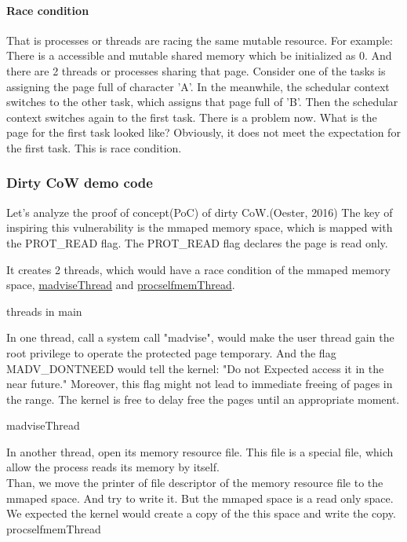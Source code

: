 \documentclass[12pt,a4paper]{IEEEconf}
\begin{document}
\paragraph{Race condition}
That is processes or threads are racing the same mutable resource. For example:
There is a accessible and mutable shared memory which be initialized as 0. And there
are 2 threads or processes sharing that page. Consider one of the tasks is assigning
the page full of character 'A'. In the meanwhile, the schedular context switches to
the other task, which assigns that page full of 'B'. Then the schedular context switches
again to the first task. There is a problem now. What is the page for the first
task looked like? Obviously, it does not meet the expectation for the first task.
This is race condition.

\subsubsection{Dirty CoW demo code}
Let's analyze the proof of concept(PoC) of dirty CoW.(Oester, 2016)\cite{Dirty_CoW}
The key of inspiring this vulnerability is the mmaped memory space, which is mapped with
the PROT\_READ flag. The PROT\_READ flag declares the page is read only.


It creates 2 threads, which would have a race condition of the mmaped memory space,
\hyperlink{madvise}{madviseThread} and \hyperlink{procself}{procselfmemThread}.

\hypertarget{threads_main}{threads in main}


In one thread, call a system call "madvise", would make the user thread gain the root
privilege to operate the protected page temporary. And the flag MADV\_DONTNEED would
tell the kernel: "Do not Expected access it in the near future.\cite{Madvise}" Moreover,
this flag might not lead to immediate freeing of pages in the range. The kernel is free
to delay free the pages until an appropriate moment.\cite{Madvise}

\hypertarget{madvise}{madviseThread}


In another thread, open its memory resource file. This file is a special file, which allow
the process reads its memory by itself.\\
Than, we move the printer of file descriptor of the memory resource file to the mmaped
space. And try to write it. But the mmaped space is a read only space. We expected the
kernel would create a copy of the this space and write the copy\cite{root_exploit}.\\
\hypertarget{procself}{procselfmemThread}

\end{document}
